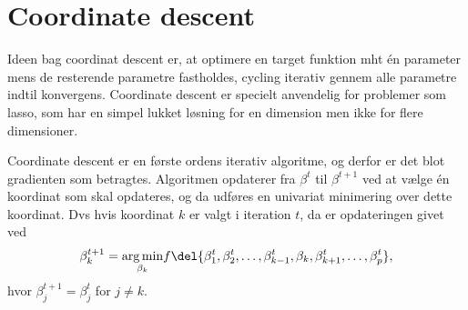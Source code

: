 \section{Coordinate descent}
Ideen bag coordinat descent er, at optimere en target funktion mht én parameter mens de resterende parametre fastholdes, cycling iterativ gennem alle parametre indtil konvergens.
Coordinate descent er specielt anvendelig for problemer som lasso, som har en simpel lukket løsning for en dimension men ikke for flere dimensioner.



Coordinate descent er en første ordens iterativ algoritme, og derfor er det blot gradienten som betragtes.
Algoritmen opdaterer fra \(\beta^t\) til \(\beta^{t+1}\) ved at vælge én koordinat som skal opdateres, og da udføres en univariat minimering over dette koordinat.
Dvs hvis koordinat $k$ er valgt i iteration $t$, da er opdateringen givet ved
\begin{align}
\beta_k^{t+1} =\underset{ \beta_k}{\arg \min}  f\del{ \beta_1^t, \beta_2^t, \dots, \beta_{k-1}^t, \beta_k, \beta_{k+1}^t, \dots, \beta_p^t  }, \label{eq:5.36}
\end{align}
hvor $\beta_j^{t+1} = \beta_j^t$ for $j \neq k$. 
%

